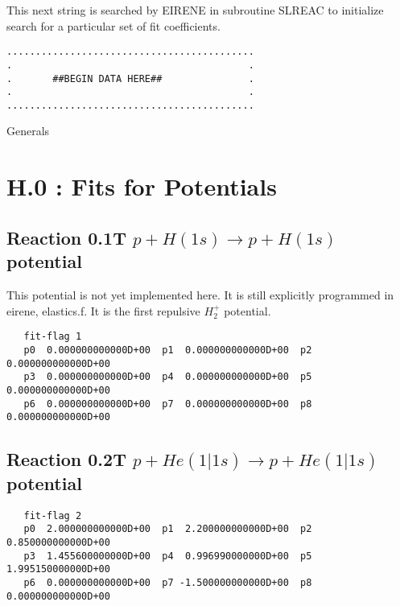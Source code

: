 \documentclass[12pt]{article}
\begin{document}
This next string is searched by EIRENE in subroutine SLREAC
to initialize search for a particular set of fit coefficients.

\bigskip
\begin{small}\begin{verbatim}
...........................................
.                                         .
.       ##BEGIN DATA HERE##               .
.                                         .
...........................................
\end{verbatim}\end{small}
\newpage
Generals
\newpage

\section{H.0 :  Fits for Potentials}

\subsection{
Reaction 0.1T $ p + H (1s) \rightarrow p + H (1s) $ potential }
This potential is not yet implemented here. It is still explicitly
programmed in eirene, elastics.f. It is the first repulsive $H_2^+$
potential.

\begin{small}\begin{verbatim}
   fit-flag 1
   p0  0.000000000000D+00  p1  0.000000000000D+00  p2  0.000000000000D+00  
   p3  0.000000000000D+00  p4  0.000000000000D+00  p5  0.000000000000D+00  
   p6  0.000000000000D+00  p7  0.000000000000D+00  p8  0.000000000000D+00
\end{verbatim}\end{small}


\newpage

\subsection{
Reaction 0.2T   $ p + He(1|1s) \rightarrow p + He (1|1s) $ 
potential }

\begin{small}\begin{verbatim}
   fit-flag 2
   p0  2.000000000000D+00  p1  2.200000000000D+00  p2  0.850000000000D+00
   p3  1.455600000000D+00  p4  0.996990000000D+00  p5  1.995150000000D+00
   p6  0.000000000000D+00  p7 -1.500000000000D+00  p8  0.000000000000D+00
\end{verbatim}\end{small}
\end{document}

